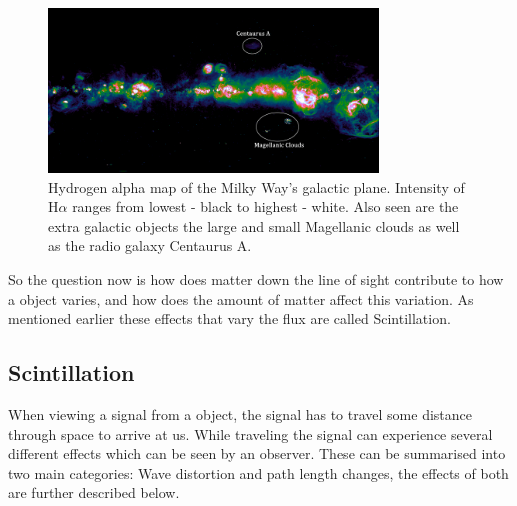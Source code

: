 \documentclass[a4paper, 10pt]{article}
\begin{document}
\begin{figure}[H]
\begin{center}
	\includegraphics[width=0.78\textwidth]{Ha1_annotated}
	\caption{Hydrogen alpha map of the Milky Way's galactic plane. Intensity of H$\alpha$ ranges from lowest - black to highest - white. Also seen are the extra galactic objects the large and small Magellanic clouds as well as the radio galaxy Centaurus A.}
	\label{Halpha}
\end{center}
\end{figure}
So the question now is how does matter down the line of sight contribute to how a object varies, and how does the amount of matter affect this variation. As mentioned earlier these effects that vary the flux are called Scintillation.

\subsection{Scintillation}\label{scint}
When viewing a signal from a object, the signal has to travel some distance through space to arrive at us. While traveling the signal can experience several different effects which can be seen by an observer. These can be summarised into two main categories: Wave distortion and path length changes, the effects of both are further described below.
\end{document}
